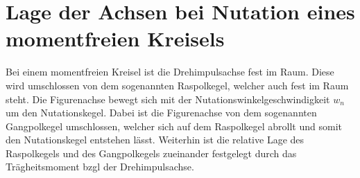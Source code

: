 

\section{Lage der Achsen bei Nutation eines momentfreien Kreisels}

Bei einem momentfreien Kreisel ist die Drehimpulsachse fest im Raum. Diese wird umschlossen von dem sogenannten \dq Raspolkegel\dq{}, welcher auch fest im Raum steht. Die Figurenachse bewegt sich mit der Nutationswinkelgeschwindigkeit $w_n$ um den Nutationskegel. Dabei ist die Figurenachse von dem sogenannten \dq Gangpolkegel\dq{} umschlossen, welcher sich auf dem Raspolkegel \dq abrollt\dq{} und somit den Nutationskegel entstehen lässt. Weiterhin ist die relative Lage des Raspolkegels und des Gangpolkegels zueinander festgelegt durch das Trägheitsmoment bzgl der Drehimpulsachse. %
